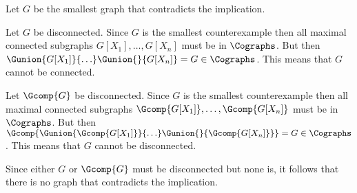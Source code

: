 Let $G$ be the smallest graph that contradicts the implication.

Let $G$ be disconnected. Since $G$ is the smallest counterexample then all maximal connected subgraphs $G[X_1], \ldots, G[X_n]$ must be in $\Cographs$. But then $\Gunion{G[X_1]}{\ldots} \Gunion{}{G[X_n]} = G \in \Cographs$. This means that $G$ cannot be connected.

Let $\Gcomp{G}$ be disconnected. Since $G$ is the smallest counterexample then all maximal connected subgraphs $\Gcomp{G[X_1]}, \ldots, \Gcomp{G[X_n]}$ must be in $\Cographs$. But then $\Gcomp{\Gunion{\Gcomp{G[X_1]}}{\ldots} \Gunion{}{\Gcomp{G[X_n]}}} = G \in \Cographs$. This means that $G$ cannot be disconnected.

Since either $G$ or $\Gcomp{G}$ must be disconnected but none is, it follows that there is no graph that contradicts the implication.
